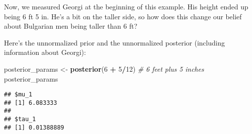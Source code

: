 \documentclass[]{book}
\newenvironment{Shaded}{\begin{snugshade}}{\end{snugshade}}
\newcommand{\KeywordTok}[1]{\textcolor[rgb]{0.13,0.29,0.53}{\textbf{#1}}}
\newcommand{\DataTypeTok}[1]{\textcolor[rgb]{0.13,0.29,0.53}{#1}}
\newcommand{\DecValTok}[1]{\textcolor[rgb]{0.00,0.00,0.81}{#1}}
\newcommand{\FloatTok}[1]{\textcolor[rgb]{0.00,0.00,0.81}{#1}}
\newcommand{\StringTok}[1]{\textcolor[rgb]{0.31,0.60,0.02}{#1}}
\newcommand{\CommentTok}[1]{\textcolor[rgb]{0.56,0.35,0.01}{\textit{#1}}}
\newcommand{\OtherTok}[1]{\textcolor[rgb]{0.56,0.35,0.01}{#1}}
\newcommand{\OperatorTok}[1]{\textcolor[rgb]{0.81,0.36,0.00}{\textbf{#1}}}
\newcommand{\NormalTok}[1]{#1}
\begin{document}
Now, we measured Georgi at the beginning of this example. His height
ended up being 6 ft 5 in. He's a bit on the taller side, so how does
this change our belief about Bulgarian men being taller than 6 ft?

Here's the unnormalized prior and the unnormalized posterior (including
information about Georgi):

\begin{Shaded}
\begin{Highlighting}[]
\NormalTok{posterior_params <-}\StringTok{ }\KeywordTok{posterior}\NormalTok{(}\DecValTok{6} \OperatorTok{+}\StringTok{ }\DecValTok{5}\OperatorTok{/}\DecValTok{12}\NormalTok{) }\CommentTok{# 6 feet plus 5 inches}
\NormalTok{posterior_params}
\end{Highlighting}
\end{Shaded}

\begin{verbatim}
## $mu_1
## [1] 6.083333
## 
## $tau_1
## [1] 0.01388889
\end{verbatim}

\begin{Shaded}
\end{Shaded}
\end{document}
